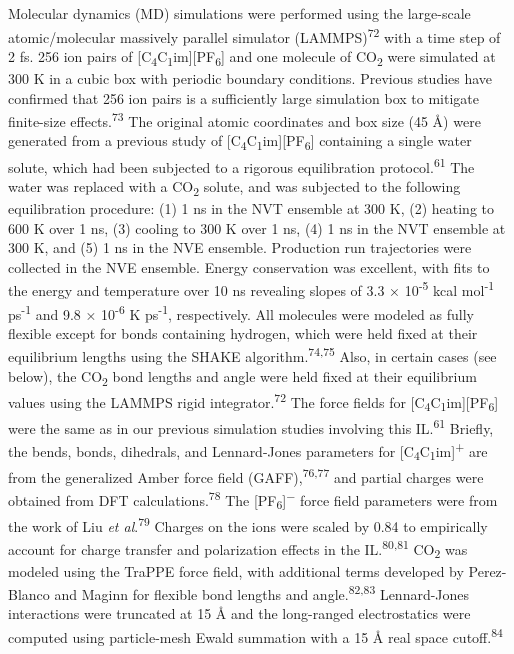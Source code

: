 \documentclass[]{article}
\begin{document}
Molecular dynamics (MD) simulations were performed using the large-scale atomic/molecular massively parallel simulator (LAMMPS)\textsuperscript{72} with a time step of 2 fs. 256 ion pairs of {[}C\textsubscript{4}C\textsubscript{1}im{]}{[}PF\textsubscript{6}{]} and one molecule of CO\textsubscript{2} were simulated at 300 K in a cubic box with periodic boundary conditions. Previous studies have confirmed that 256 ion pairs is a sufficiently large simulation box to mitigate finite-size effects.\textsuperscript{73} The original atomic coordinates and box size (45 Å) were generated from a previous study of {[}C\textsubscript{4}C\textsubscript{1}im{]}{[}PF\textsubscript{6}{]} containing a single water solute, which had been subjected to a rigorous equilibration protocol.\textsuperscript{61} The water was replaced with a CO\textsubscript{2} solute, and was subjected to the following equilibration procedure: (1) 1 ns in the NVT ensemble at 300 K, (2) heating to 600 K over 1 ns, (3) cooling to 300 K over 1 ns, (4) 1 ns in the NVT ensemble at 300 K, and (5) 1 ns in the NVE ensemble. Production run trajectories were collected in the NVE ensemble. Energy conservation was excellent, with fits to the energy and temperature over 10 ns revealing slopes of 3.3 × 10\textsuperscript{-5} kcal mol\textsuperscript{-1} ps\textsuperscript{-1} and 9.8 × 10\textsuperscript{-6} K ps\textsuperscript{-1}, respectively. All molecules were modeled as fully flexible except for bonds containing hydrogen, which were held fixed at their equilibrium lengths using the SHAKE algorithm.\textsuperscript{74,75} Also, in certain cases (see below), the CO\textsubscript{2} bond lengths and angle were held fixed at their equilibrium values using the LAMMPS rigid integrator.\textsuperscript{72} The force fields for {[}C\textsubscript{4}C\textsubscript{1}im{]}{[}PF\textsubscript{6}{]} were the same as in our previous simulation studies involving this IL.\textsuperscript{61} Briefly, the bends, bonds, dihedrals, and Lennard-Jones parameters for {[}C\textsubscript{4}C\textsubscript{1}im{]}\textsuperscript{+} are from the generalized Amber force field (GAFF),\textsuperscript{76,77} and partial charges were obtained from DFT calculations.\textsuperscript{78} The {[}PF\textsubscript{6}{]}\textsuperscript{−} force field parameters were from the work of Liu \emph{et al}.\textsuperscript{79} Charges on the ions were scaled by 0.84 to empirically account for charge transfer and polarization effects in the IL.\textsuperscript{80,81} CO\textsubscript{2} was modeled using the TraPPE force field, with additional terms developed by Perez-Blanco and Maginn for flexible bond lengths and angle.\textsuperscript{82,83} Lennard-Jones interactions were truncated at 15 Å and the long-ranged electrostatics were computed using particle-mesh Ewald summation with a 15 Å real space cutoff.\textsuperscript{84}
\end{document}
